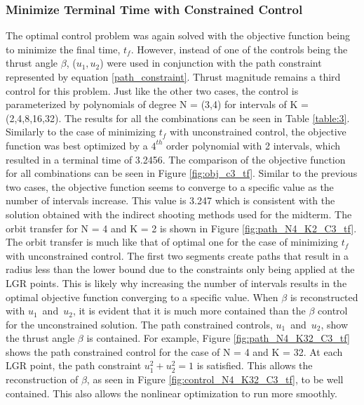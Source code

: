 \documentclass[]{article}
\begin{document}
	\subsubsection{Minimize Terminal Time with Constrained Control}
	 The optimal control problem was again solved with the objective function being to minimize the final time, \(t_f\). However, instead of one of the controls being the thrust angle \(\beta\), (\(u_1,u_2\)) were used in conjunction with the path constraint represented by equation \ref{path_constraint}. Thrust magnitude remains a third control for this problem. Just like the other two cases, the control is parameterized by polynomials of degree N = (3,4) for intervals of K = (2,4,8,16,32). The results for all the combinations can be seen in Table \ref{table:3}. Similarly to the case of minimizing \(t_f\) with unconstrained control, the objective function was best optimized by a \(4^{th}\) order polynomial with 2 intervals, which resulted in a terminal time of 3.2456. The comparison of the objective function for all combinations can be seen in Figure \ref{fig:obj_c3_tf}. Similar to the previous two cases, the objective function seems to converge to a specific value as the number of intervals increase. This value is 3.247 which is consistent with the solution obtained with the indirect shooting methods used for the midterm. The orbit transfer for N = 4 and K = 2 is shown in Figure \ref{fig:path_N4_K2_C3_tf}. The orbit transfer is much like that of optimal one for the case of minimizing \(t_f\) with unconstrained control. The first two segments create paths that result in a radius less than the lower bound due to the constraints only being applied at the LGR points. This is likely why increasing the number of intervals results in the optimal objective function converging to a specific value. When \(\beta\) is reconstructed with \(u_1\)\ and\ \(u_2\), it is evident that it is much more contained than the \(\beta\) control for the unconstrained solution. The path constrained controls, \(u_1\)\ and\ \(u_2\), show the thrust angle \(\beta\) is contained. For example, Figure \ref{fig:path_N4_K32_C3_tf} shows the path constrained control for the case of N = 4 and K = 32. At each LGR point, the path constraint \(u_1^2 + u_2^2 = 1\) is satisfied. This allows the reconstruction of \(\beta\), as seen in Figure \ref{fig:control_N4_K32_C3_tf}, to be well contained. This also allows the nonlinear optimization to run more smoothly.
\end{document}
